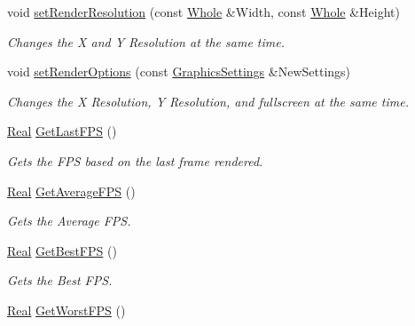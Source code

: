 \begin{DoxyCompactItemize}
void \hyperlink{classphys_1_1GameWindow_a35ecbf1cb77037d33671e0f879f46a30}{setRenderResolution} (const \hyperlink{namespacephys_a460f6bc24c8dd347b05e0366ae34f34a}{Whole} \&Width, const \hyperlink{namespacephys_a460f6bc24c8dd347b05e0366ae34f34a}{Whole} \&Height)
\begin{DoxyCompactList}\small\item\em Changes the X and Y Resolution at the same time. \item\end{DoxyCompactList}\item 
void \hyperlink{classphys_1_1GameWindow_a430e91d4aeb6d1eb62ae84f498310593}{setRenderOptions} (const \hyperlink{structphys_1_1GraphicsSettings}{GraphicsSettings} \&NewSettings)
\begin{DoxyCompactList}\small\item\em Changes the X Resolution, Y Resolution, and fullscreen at the same time. \item\end{DoxyCompactList}\item 
\hyperlink{namespacephys_af7eb897198d265b8e868f45240230d5f}{Real} \hyperlink{classphys_1_1GameWindow_ab2b0d9150f394aa1b71f001768c6b011}{GetLastFPS} ()
\begin{DoxyCompactList}\small\item\em Gets the FPS based on the last frame rendered. \item\end{DoxyCompactList}\item 
\hyperlink{namespacephys_af7eb897198d265b8e868f45240230d5f}{Real} \hyperlink{classphys_1_1GameWindow_a3ec29af7b989701e3c14409f34497a15}{GetAverageFPS} ()
\begin{DoxyCompactList}\small\item\em Gets the Average FPS. \item\end{DoxyCompactList}\item 
\hyperlink{namespacephys_af7eb897198d265b8e868f45240230d5f}{Real} \hyperlink{classphys_1_1GameWindow_ab0fbfc031d5ace19cd79d8c3e6c8f4aa}{GetBestFPS} ()
\begin{DoxyCompactList}\small\item\em Gets the Best FPS. \item\end{DoxyCompactList}\item 
\hyperlink{namespacephys_af7eb897198d265b8e868f45240230d5f}{Real} \hyperlink{classphys_1_1GameWindow_a26518aba7a4edbc6628d9f777b62bcaa}{GetWorstFPS} ()

\end{DoxyCompactItemize}
